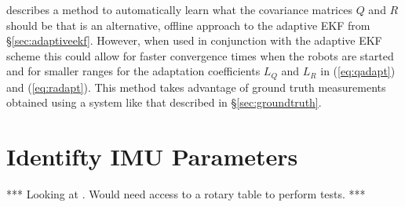 \cite{Abbeel-RSS-05} describes a method to automatically learn what the covariance matrices $Q$ and $R$ should be that is an alternative, offline approach to the adaptive EKF from \S\ref{sec:adaptiveekf}. However, when used in conjunction with the adaptive EKF scheme this could allow for faster convergence times when the robots are started and for smaller ranges for the adaptation coefficients $L_Q$ and $L_R$ in (\ref{eq:qadapt}) and (\ref{eq:radapt}). This method takes advantage of ground truth measurements obtained using a system like that described in \S\ref{sec:groundtruth}.

\section{Identifty IMU Parameters}
\label{sec:identifyimuparams}
*** Looking at \cite{ChungOjeda01}. Would need access to a rotary table to perform tests. ***
